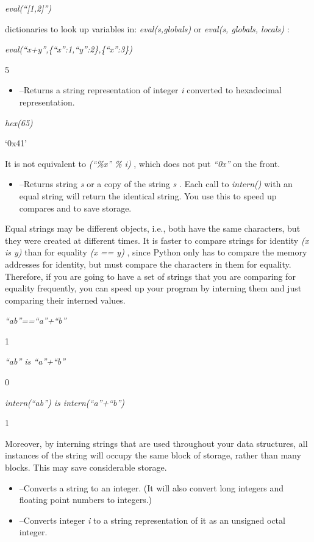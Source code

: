 \emph{eval(``{[}1,2{]}'')}




dictionaries to look up variables in: \emph{eval(s,globals)} or
\emph{eval(s, globals, locals)} :


\emph{eval(``x+y'',\{``x'':1,``y'':2\},\{``x'':3\})}

5

\begin{itemize}

\item
   --Returns a string
  representation of integer \emph{i} converted to hexadecimal
  representation.
\end{itemize}


\emph{hex(65)}

`0x41'

It is not equivalent to
\emph{(``\%x'' \% i)} , which does not put \emph{``0x''} on the front.

\begin{itemize}

\item
   --Returns
  string \emph{s} or a copy of the string \emph{s} . Each call to
  \emph{intern()} with an equal string will return the identical string.
  You use this to speed up compares and to save storage.
\end{itemize}

Equal strings may be different
objects, i.e., both have the same characters, but they were created at
different times. It is faster to compare strings for identity \emph{(x
is y)} than for equality \emph{(x == y)} , since Python only has to
compare the memory addresses for identity, but must compare the
characters in them for equality. Therefore, if you are going to have a
set of strings that you are comparing for equality frequently, you can
speed up your program by interning them and just comparing their
interned values.


\emph{``ab''==``a''+``b''}

1


\emph{``ab'' is ``a''+``b''}

0


\emph{intern(``ab'') is intern(``a''+``b'')}

1

Moreover, by interning strings that
are used throughout your data structures, all instances of the string
will occupy the same block of storage, rather than many blocks. This may
save considerable storage.

\begin{itemize}

\item
   --Converts a
  string to an integer. (It will also convert long integers and floating
  point numbers to integers.)
\item
   --Converts integer
  \emph{i} to a string representation of it as an unsigned octal
  integer.
\end{itemize}


